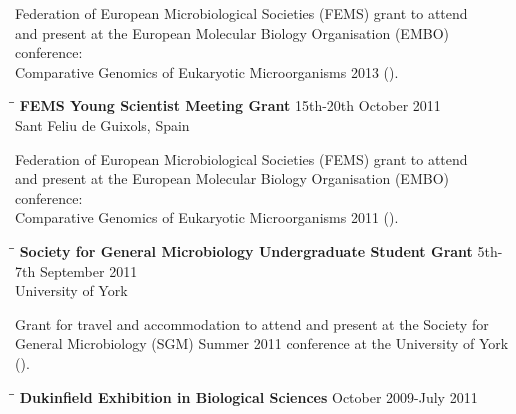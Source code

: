 \documentclass{res}
\begin{document}
\begin{resume}
\begin{tabbing}
   \end{tabbing}\vspace{-30pt}      

   Federation of European Microbiological Societies (FEMS) grant to attend\\ and present at the European Molecular Biology Organisation (EMBO) conference:\\ Comparative Genomics of Eukaryotic Microorganisms 2013 ().

 
 \vspace{-0.1in}  
   \begin{tabbing}
   \hspace{2in}\= \hspace{2.6in}\= \kill 
    {\bf FEMS Young Scientist Meeting Grant} \> \> 15th-20th October 2011\\
                            \>  
                            \> Sant Feliu de Guixols, Spain \\
                       
   \end{tabbing}\vspace{-30pt}      

   Federation of European Microbiological Societies (FEMS) grant to attend\\ and present at the European Molecular Biology Organisation (EMBO) conference: \\ Comparative Genomics of Eukaryotic Microorganisms 2011 ().

 
\vspace{-0.1in}  
   \begin{tabbing}
   \hspace{2in}\= \hspace{2.6in}\= \kill
    {\bf Society for General Microbiology Undergraduate Student Grant} \> \> 5th-7th September 2011\\
                            \> 
                            \> University of York \\

   \end{tabbing}\vspace{-30pt}      
   Grant for travel and accommodation to attend and present at the Society for \\ General Microbiology (SGM) Summer 2011 conference at the University of York (). 

 
   \begin{tabbing}
   \hspace{2in}\= \hspace{2.6in}\= \kill 
    {\bf Dukinfield Exhibition in Biological Sciences} \> \>        October 2009-July 2011\\
                                               

\end{tabbing}
\end{resume}
\end{document}
